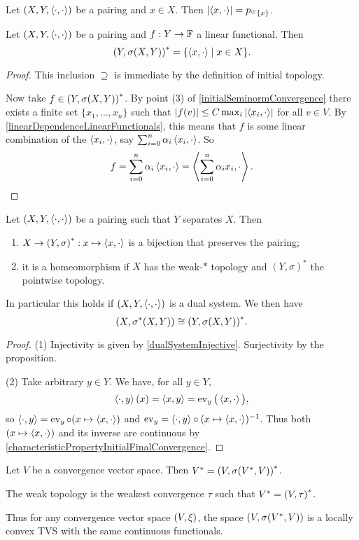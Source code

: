 \begin{lemma}
Let $(X,Y,\left\langle \cdot,\cdot \right\rangle)$ be a pairing and $x\in X$. Then $\left|\left\langle x,\cdot \right\rangle\right| = p_{^\oslash\{x\}}$.
\end{lemma}

\begin{proposition} \label{functionalContinuityWeakTopology}
Let $\left( X,Y,\left\langle \cdot,\cdot \right\rangle \right)$ be a pairing and $f: Y\to \mathbb{F}$ a linear functional. Then
\[ \dual{(Y,\sigma(X,Y))} = \setbuilder{\pair{x,\cdot}}{x\in X}. \]
\end{proposition}
\begin{proof}
This inclusion $\supseteq$ is immediate by the definition of initial topology.

Now take $f\in {(Y,\sigma(X,Y))}^*$. By point (3) of \ref{initialSeminormConvergence} there exists a finite set $\{x_1, \ldots, x_n\}$ such that $|f(v)| \leq C\max_{i}\left|\left\langle x_i, \cdot \right\rangle\right|$ for all $v\in V$. By \ref{linearDependenceLinearFunctionals}, this means that $f$ is some linear combination of the $\left\langle x_i,\cdot \right\rangle$, say $\sum_{i=0}^n \alpha_i \left\langle x_i, \cdot \right\rangle$. So
\[ f = \sum_{i=0}^n \alpha_i \left\langle x_i, \cdot \right\rangle = \left\langle \sum_{i=0}^n \alpha_i x_i, \cdot \right\rangle. \]
\end{proof}
\begin{corollary} \label{dualSystemBijection}
Let $\left( X,Y,\left\langle \cdot,\cdot \right\rangle \right)$ be a pairing such that $Y$ separates $X$. Then
\begin{enumerate}
\item $X\to \left( Y, \sigma \right)^*: x\mapsto \left\langle x,\cdot \right\rangle$ is a bijection that preserves the pairing;
\item it is a homeomorphism if $X$ has the weak-$*$ topology and $(Y,\sigma)^*$ the pointwise topology.
\end{enumerate} 
\end{corollary}
In particular this holds if $\left( X,Y,\left\langle \cdot,\cdot \right\rangle \right)$ is a dual system. We then have
\[ \left( X,\sigma^*(X,Y) \right) \cong {\left( Y,\sigma(X,Y) \right)}^*. \]
\begin{proof}
(1) Injectivity is given by \ref{dualSystemInjective}. Surjectivity by the proposition.

(2) Take arbitrary $y\in Y$. We have, for all $y\in Y$,
\[ \left\langle \cdot, y \right\rangle(x) = \left\langle x,y \right\rangle = \operatorname{ev}_y\big(\left\langle x, \cdot \right\rangle\big), \]
so $\left\langle \cdot, y \right\rangle = \operatorname{ev}_y \circ (x\mapsto \left\langle x,\cdot \right\rangle)$ and $\operatorname{ev}_y = \left\langle \cdot, y \right\rangle \circ (x\mapsto \left\langle x,\cdot \right\rangle)^{-1}$. Thus both $(x\mapsto \left\langle x,\cdot \right\rangle)$ and its inverse are continuous by \ref{characteristicPropertyInitialFinalConvergence}.
\end{proof}
\begin{corollary} \label{weakestConvergenceOfTheDualPair}
Let $V$ be a convergence vector space. Then $V^* = \left( V, \sigma(V^*, V) \right)^*$.

The weak topology is the weakest convergence $\tau$ such that $V^* = \left( V, \tau \right)^*$.
\end{corollary}
Thus for any convergence vector space $\left( V,\xi \right)$, the space $\left( V, \sigma(V^*, V) \right)$ is a locally convex TVS with the same continuous functionals.

